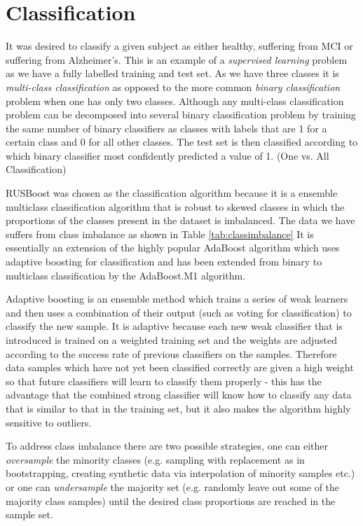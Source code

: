 \section{Classification}

It was desired to classify a given subject as either healthy, suffering from MCI or suffering from Alzheimer's. This is an example of a \textit{supervised learning} problem as we have a fully labelled training and test set. As we have three classes it is \textit{multi-class classification} as opposed to the more common \textit{binary classification} problem when one has only two classes. Although any multi-class classification problem can be decomposed into several binary classification problem by training the same number of binary classifiers as classes with labels that are 1 for a certain class and 0 for all other classes. The test set is then classified according to which binary classifier most confidently predicted a value of 1. (One vs. All Classification) \cite{Witten2011}

RUSBoost was chosen as the classification algorithm because it is a ensemble multiclass classification algorithm that is robust to skewed classes in which the proportions of the classes present in the dataset is imbalanced.\cite{Seiffert2010} The data we have suffers from class imbalance as shown in Table \ref{tab:classimbalance} It is essentially an extension of the highly popular AdaBoost algorithm which uses adaptive boosting for classification and has been extended from binary to multiclass classification by the AdaBoost.M1 algorithm\cite{Witten2011}.

Adaptive boosting is an ensemble method which trains a series of weak learners and then uses a combination of their output (such as voting for classification) to classify the new sample. It is adaptive because each new weak classifier that is introduced is trained on a weighted training set and the weights are adjusted according to the success rate of previous classifiers on the samples. Therefore data samples which have not yet been classified correctly are given a high weight so that future classifiers will learn to classify them properly - this has the advantage that the combined strong classifier will know how to classify any data that is similar to that in the training set, but it also makes the algorithm highly sensitive to outliers.\cite{Witten2011}

To address class imbalance there are two possible strategies, one can either \textit{oversample} the minority classes  (e.g. sampling with replacement as in bootstrapping, creating synthetic data via interpolation of minority samples etc.) or one can \textit{undersample} the majority set (e.g. randomly leave out some of the majority class samples) until the desired class proportions are reached in the sample set.

